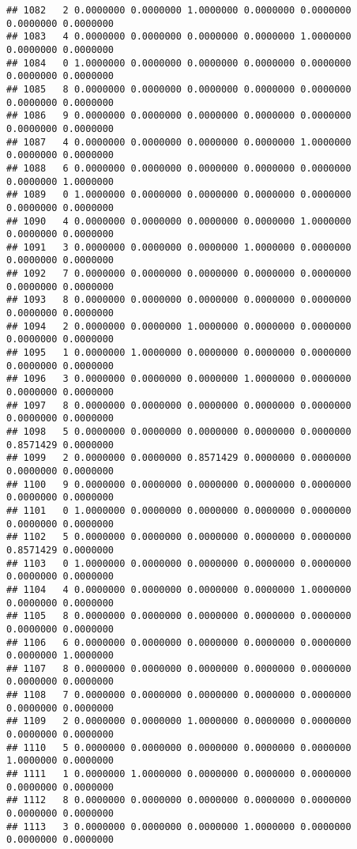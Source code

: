 \documentclass[
]{article}
\begin{document}
\begin{verbatim}
## 1082   2 0.0000000 0.0000000 1.0000000 0.0000000 0.0000000 0.0000000 0.0000000
## 1083   4 0.0000000 0.0000000 0.0000000 0.0000000 1.0000000 0.0000000 0.0000000
## 1084   0 1.0000000 0.0000000 0.0000000 0.0000000 0.0000000 0.0000000 0.0000000
## 1085   8 0.0000000 0.0000000 0.0000000 0.0000000 0.0000000 0.0000000 0.0000000
## 1086   9 0.0000000 0.0000000 0.0000000 0.0000000 0.0000000 0.0000000 0.0000000
## 1087   4 0.0000000 0.0000000 0.0000000 0.0000000 1.0000000 0.0000000 0.0000000
## 1088   6 0.0000000 0.0000000 0.0000000 0.0000000 0.0000000 0.0000000 1.0000000
## 1089   0 1.0000000 0.0000000 0.0000000 0.0000000 0.0000000 0.0000000 0.0000000
## 1090   4 0.0000000 0.0000000 0.0000000 0.0000000 1.0000000 0.0000000 0.0000000
## 1091   3 0.0000000 0.0000000 0.0000000 1.0000000 0.0000000 0.0000000 0.0000000
## 1092   7 0.0000000 0.0000000 0.0000000 0.0000000 0.0000000 0.0000000 0.0000000
## 1093   8 0.0000000 0.0000000 0.0000000 0.0000000 0.0000000 0.0000000 0.0000000
## 1094   2 0.0000000 0.0000000 1.0000000 0.0000000 0.0000000 0.0000000 0.0000000
## 1095   1 0.0000000 1.0000000 0.0000000 0.0000000 0.0000000 0.0000000 0.0000000
## 1096   3 0.0000000 0.0000000 0.0000000 1.0000000 0.0000000 0.0000000 0.0000000
## 1097   8 0.0000000 0.0000000 0.0000000 0.0000000 0.0000000 0.0000000 0.0000000
## 1098   5 0.0000000 0.0000000 0.0000000 0.0000000 0.0000000 0.8571429 0.0000000
## 1099   2 0.0000000 0.0000000 0.8571429 0.0000000 0.0000000 0.0000000 0.0000000
## 1100   9 0.0000000 0.0000000 0.0000000 0.0000000 0.0000000 0.0000000 0.0000000
## 1101   0 1.0000000 0.0000000 0.0000000 0.0000000 0.0000000 0.0000000 0.0000000
## 1102   5 0.0000000 0.0000000 0.0000000 0.0000000 0.0000000 0.8571429 0.0000000
## 1103   0 1.0000000 0.0000000 0.0000000 0.0000000 0.0000000 0.0000000 0.0000000
## 1104   4 0.0000000 0.0000000 0.0000000 0.0000000 1.0000000 0.0000000 0.0000000
## 1105   8 0.0000000 0.0000000 0.0000000 0.0000000 0.0000000 0.0000000 0.0000000
## 1106   6 0.0000000 0.0000000 0.0000000 0.0000000 0.0000000 0.0000000 1.0000000
## 1107   8 0.0000000 0.0000000 0.0000000 0.0000000 0.0000000 0.0000000 0.0000000
## 1108   7 0.0000000 0.0000000 0.0000000 0.0000000 0.0000000 0.0000000 0.0000000
## 1109   2 0.0000000 0.0000000 1.0000000 0.0000000 0.0000000 0.0000000 0.0000000
## 1110   5 0.0000000 0.0000000 0.0000000 0.0000000 0.0000000 1.0000000 0.0000000
## 1111   1 0.0000000 1.0000000 0.0000000 0.0000000 0.0000000 0.0000000 0.0000000
## 1112   8 0.0000000 0.0000000 0.0000000 0.0000000 0.0000000 0.0000000 0.0000000
## 1113   3 0.0000000 0.0000000 0.0000000 1.0000000 0.0000000 0.0000000 0.0000000

\end{verbatim}
\end{document}
